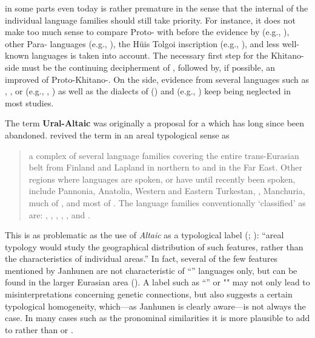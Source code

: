  in some parts even today is rather premature in the sense that the internal  of the individual language families should still take priority. For instance, it does not make too much sense to compare Proto- with  before the evidence by  (e.g., \citealt{Janhunen2012d}), other Para- languages (e.g., \citealt{Shimunek2017}), the Hüis Tolgoi inscription (e.g., \citealt{Vovin2017}), and less well-known  languages is taken into account. The necessary first step for the Khitano- side must be the continuing decipherment of , followed by, if possible, an improved  of Proto-Khitano-. On the  side, evidence from several languages such as , , or  (e.g., \citealt{MuYejun1985,MuYejun1986,MuYejun1987}, \citealt{Hölzl2017c,Hölzl2018a}) as well as the dialects of  (\citealt{WhaleyLi2000}) and  (e.g., \citealt{Hölzl2018b}) keep being neglected in most studies.

The term \textbf{Ural-Altaic} was originally a proposal for a  which has long since been abandoned. \citet[78]{Janhunen2007a} revived the term in an areal typological sense as

\begin{quote}
a complex of several language families covering the entire trans-Eurasian belt from Finland and Lapland in northern  to  and  in the Far East. Other regions where  languages are spoken, or have until recently been spoken, include Pannonia, Anatolia, Western and Eastern Turkestan, , Manchuria, much of , and most of . The language families conventionally ‘classified’ as  are: , , , , , and .
\end{quote}

\noindent This is as problematic as the use of \textit{Altaic} as a typological label (\citealt{Janhunen2007a}; \citealt{Janhunen2007b}): “areal typology would study the geographical distribution of such features, rather than the characteristics of individual areas.” \citep[1456]{Dahl2001} In fact, several of the few features mentioned by Janhunen are not characteristic of “” languages only, but can be found in the larger Eurasian area (). A label such as “” or "" may not only lead to misinterpretations concerning genetic connections, but also suggests a certain typological homogeneity, which---as Janhunen is clearly aware---is not always the case. In many cases such as the pronominal similarities it is more plausible to add  to  rather than  or .

